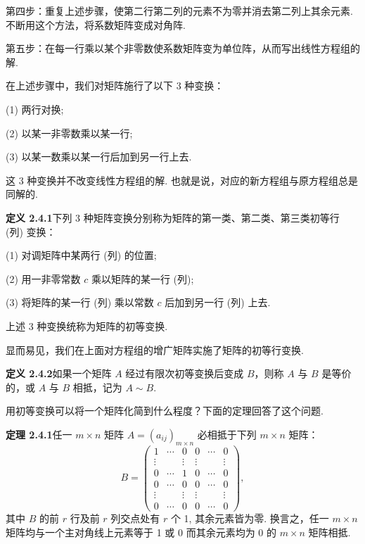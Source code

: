 \documentclass[UTF8, 12pt, fontset=fandol, oneside]{ctexart}
\begin{document}
第四步：重复上述步骤，使第二行第二列的元素不为零并消去第二列上其余元素. 不断用这个方法，将系数矩阵变成对角阵.

第五步：在每一行乘以某个非零数使系数矩阵变为单位阵，从而写出线性方程组的解.

在上述步骤中，我们对矩阵施行了以下 3 种变换：

(1) 两行对换;

(2) 以某一非零数乘以某一行;

(3) 以某一数乘以某一行后加到另一行上去.

这 3 种变换并不改变线性方程组的解. 也就是说，对应的新方程组与原方程组总是同解的.

\noindent\textbf{定义 2.4.1}\quad 下列 3 种矩阵变换分别称为矩阵的第一类、第二类、第三类初等行 (列) 变换：

(1) 对调矩阵中某两行 (列) 的位置;

(2) 用一非零常数 $c$ 乘以矩阵的某一行 (列);

(3) 将矩阵的某一行 (列) 乘以常数 $c$ 后加到另一行 (列) 上去.

上述 3 种变换统称为矩阵的初等变换.

显而易见，我们在上面对方程组的增广矩阵实施了矩阵的初等行变换.

\noindent\textbf{定义 2.4.2}\quad 如果一个矩阵 $A$ 经过有限次初等变换后变成 $B$，则称 $A$ 与 $B$ 是等价的，或 $A$ 与 $B$ 相抵，记为 $A\sim B$.

用初等变换可以将一个矩阵化简到什么程度？下面的定理回答了这个问题.

\noindent\textbf{定理 2.4.1}\quad 任一 $m\times n$ 矩阵 $A=(a_{ij})_{m\times n}$ 必相抵于下列 $m\times n$ 矩阵：
\begin{equation}
B=\left(\begin{array}{cccccc}
1 & \cdots & 0 & 0 & \cdots & 0\\
\vdots & & \vdots & \vdots & & \vdots\\
0 & \cdots & 1 & 0 & \cdots & 0\\
0 & \cdots & 0 & 0 & \cdots & 0\\
\vdots & & \vdots & \vdots & & \vdots\\
0 & \cdots & 0 & 0 & \cdots & 0
\end{array}\right),
\tag{2.4.1}
\end{equation}
其中 $B$ 的前 $r$ 行及前 $r$ 列交点处有 $r$ 个 1, 其余元素皆为零. 换言之，任一 $m\times n$ 矩阵均与一个主对角线上元素等于 1 或 0 而其余元素均为 0 的 $m\times n$ 矩阵相抵.
\end{document}
